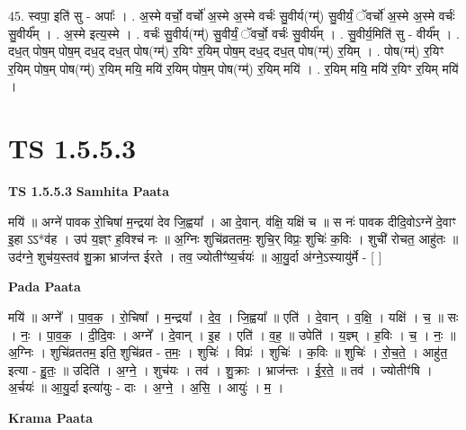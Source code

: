 \documentclass[17pt]{extarticle}
\begin{document}
45. स्वपा॒ इति॑ सु - अपाः᳚ । . अ॒स्मे वर्चो॒ वर्चो॑ अ॒स्मे अ॒स्मे वर्चः॑ सु॒वीर्य(ग्म्॑) सु॒वीर्यं॒ ॅवर्चो॑ अ॒स्मे अ॒स्मे वर्चः॑ सु॒वीर्य᳚म् । . अ॒स्मे इत्य॒स्मे । . वर्चः॑ सु॒वीर्य(ग्म्॑) सु॒वीर्यं॒ ॅवर्चो॒ वर्चः॑ सु॒वीर्य᳚म् । . सु॒वीर्य॒मिति॑ सु - वीर्य᳚म् । . दध॒त् पोष॒म् पोष॒म् दध॒द् दध॒त् पोष(ग्म्॑) र॒यिꣳ र॒यिम् पोष॒म् दध॒द् दध॒त् पोष(ग्म्॑) र॒यिम् । . पोष(ग्म्॑) र॒यिꣳ र॒यिम् पोष॒म् पोष(ग्म्॑) र॒यिम् मयि॒ मयि॑ र॒यिम् पोष॒म् पोष(ग्म्॑) र॒यिम् मयि॑ । . र॒यिम् मयि॒ मयि॑ र॒यिꣳ र॒यिम् मयि॑ । \newline
\pagebreak
{}

\section{ TS 1.5.5.3 }

\textbf{TS 1.5.5.3 } \newline
\textbf{Samhita Paata} \newline

मयि॑ ॥ अग्ने॑ पावक रो॒चिषा॑ म॒न्द्रया॑ देव जि॒ह्वया᳚ । आ दे॒वान्. व॑क्षि॒ यक्षि॑ च ॥ स नः॑ पावक दीदि॒वोऽग्ने॑ दे॒वाꣳ इ॒हा ऽऽ*व॑ह । उप॑ य॒ज्ञ्ꣳ ह॒विश्च॑ नः ॥ अ॒ग्निः शुचि॑व्रततमः॒ शुचि॒र् विप्रः॒ शुचिः॑ क॒विः । शुची॑ रोचत॒ आहु॑तः ॥ उद॑ग्ने॒ शुच॑य॒स्तव॑ शु॒क्रा भ्राज॑न्त ईरते । तव॒ ज्योतीꣳ॑ष्य॒र्चयः॑ ॥ आ॒यु॒र्दा अ॑ग्ने॒ऽस्यायु॑र्मे - [ ] \newline

\textbf{Pada Paata} \newline

मयि॑ ॥ अग्ने᳚ । पा॒व॒क॒ । रो॒चिषा᳚ । म॒न्द्रया᳚ । दे॒व॒ । जि॒ह्वया᳚ ॥ एति॑ । दे॒वान् । व॒क्षि॒ । यक्षि॑ । च॒ ॥ सः । नः॒ । पा॒व॒क॒ । दी॒दि॒वः । अग्ने᳚ । दे॒वान् । इ॒ह । एति॑ । व॒ह॒ ॥ उपेति॑ । य॒ज्ञ्म् । ह॒विः । च॒ । नः॒ ॥ अ॒ग्निः । शुचि॑व्रततम॒ इति॒ शुचि॑व्रत - त॒मः॒ । शुचिः॑ । विप्रः॑ । शुचिः॑ । क॒विः ॥ शुचिः॑ । रो॒च॒ते॒ । आहु॑त॒ इत्या - हु॒तः॒ ॥ उदिति॑ । अ॒ग्ने॒ । शुच॑यः । तव॑ । शु॒क्राः । भ्राज॑न्तः । ई॒र॒ते॒ ॥ तव॑ । ज्योतीꣳ॑षि । अ॒र्चयः॑ ॥ आ॒यु॒र्दा इत्या॑युः - दाः । अ॒ग्ने॒ । अ॒सि॒ । आयुः॑ । म॒ ।  \newline


\textbf{Krama Paata} \newline
\end{document}
